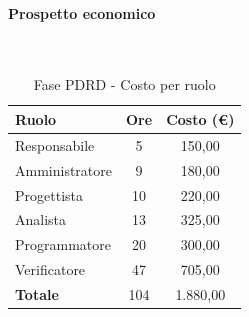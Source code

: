 \documentclass[../PianoProgetto.tex]{subfiles}
\begin{document}
	\paragraph{Prospetto economico}\
					
	\begin{table}[H]
		\centering
	
		\begin{tabular}{l * {2}{c}}
			\toprule
			\textbf{Ruolo} & \textbf{Ore} & \textbf{Costo (\euro{})} \\
			\midrule
			Responsabile & 5 & 150,00 \\
			Amministratore  & 9 & 180,00 \\
			Progettista  & 10 & 220,00 \\
			Analista & 13 & 325,00 \\
			Programmatore  & 20 & 300,00 \\
			Verificatore  & 47 & 705,00 \\
			\midrule
			\textbf{Totale}  & 104 & 1.880,00 \\
			\bottomrule
		\end{tabular}
		\caption{Fase PDRD - Costo per ruolo}
		\label{tab:fasePDRD_costo}
	\end{table}
\vfill	
	
\end{document}
